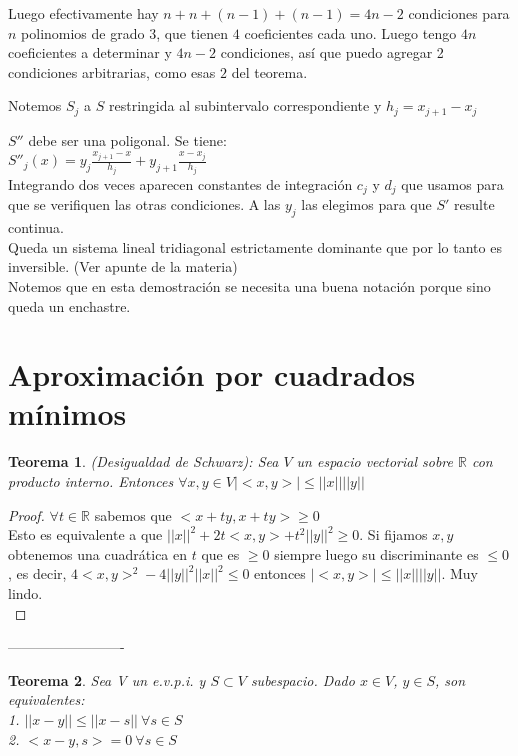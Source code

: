 \documentclass[10pt,a4paper,final]{report}
\newtheorem{theorem}{Teorema}
\begin{document}
{Luego efectivamente hay $n+n+(n-1) + (n-1) = 4n-2$ condiciones para $n$ polinomios de grado 3, que tienen $4$ coeficientes cada uno. Luego tengo $4n$ coeficientes a determinar y $4n-2$ condiciones, así que puedo agregar 2 condiciones arbitrarias, como esas $2$ del teorema. 

Notemos $S_j$ a $S$ restringida al subintervalo correspondiente y $h_j = x_{j+1} - x_j$

$S''$ debe ser una poligonal. Se tiene:\\

$S''_j(x) = y_j \frac{x_{j+1}-x}{h_j}+ y_{j+1} \frac{x-x_j}{h_j}$\\

Integrando dos veces aparecen constantes de integración $c_j$ y $d_j$ que usamos para que se verifiquen las otras condiciones. A las $y_j$ las elegimos para que $S'$ resulte continua.\\

Queda un sistema lineal tridiagonal estrictamente dominante que por lo tanto es inversible. (Ver apunte de la materia)\\

Notemos que en esta demostración se necesita una buena notación porque sino queda un enchastre.

\section{Aproximación por cuadrados mínimos}

\begin{theorem} (Desigualdad de Schwarz): Sea $V$ un espacio vectorial sobre $\mathbb{R}$ con producto interno. Entonces $\forall x,y \in V |<x,y>| \leq ||x|| ||y||$\\
\end{theorem}


\begin{proof}$\forall t\in\mathbb{R}$ sabemos que $<x+ty,x+ty> \geq 0$\\

Esto es equivalente a que $||x||^2 + 2t<x,y> + t^2 ||y||^2 \geq 0$. Si fijamos $x,y$ obtenemos una cuadrática en $t$ que es $\geq 0$ siempre luego su discriminante es $\leq 0$, es decir, $4<x,y>^2 - 4 ||y||^2 ||x||^2 \leq 0$ entonces $|<x,y>| \leq ||x|| ||y||$. Muy lindo.\\
\end{proof}
-------------------------

\begin{theorem} Sea V un e.v.p.i. y $S \subset V$ subespacio. Dado $x\in V$, $y\in S$, son equivalentes:
\\
1. $||x-y|| \leq ||x-s||\ \forall s\in S$\\
2. $<x-y,s> = 0\ \forall s\in S$\\


\end{theorem}}
\end{document}
